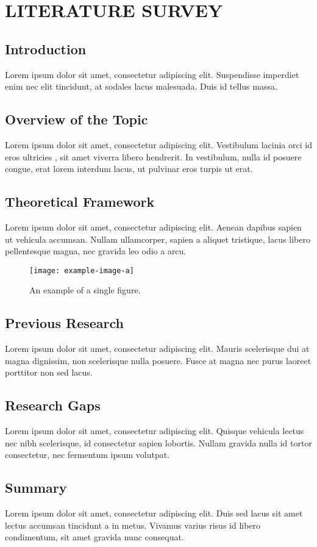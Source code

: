 \chapter{LITERATURE SURVEY}
\section{Introduction}
Lorem ipsum dolor sit amet, consectetur adipiscing elit. Suspendisse imperdiet enim nec elit tincidunt, at sodales lacus malesuada. Duis id tellus massa.

\section{Overview of the Topic}
Lorem ipsum dolor sit amet, consectetur adipiscing elit. Vestibulum lacinia orci id eros ultricies \cite{johnson2018deep}, sit amet viverra libero hendrerit. In vestibulum, nulla id posuere congue, erat lorem interdum lacus, ut pulvinar eros turpis ut erat.

\section{Theoretical Framework}
Lorem ipsum dolor sit amet, consectetur adipiscing elit. Aenean dapibus sapien ut vehicula accumsan. Nullam ullamcorper, sapien a aliquet tristique, lacus libero pellentesque magna, nec gravida leo odio a arcu.
\begin{figure}[ht]
    \centering
    \texttt{[image: example-image-a]}
    \caption{An example of a single figure.}
    \label{fig:single}
\end{figure}
\section{Previous Research}
Lorem ipsum dolor sit amet, consectetur adipiscing elit. Mauris scelerisque dui at magna dignissim, \cite{lee2019advances}non scelerisque nulla posuere. Fusce at magna nec purus laoreet porttitor non sed lacus.

\section{Research Gaps}
Lorem ipsum dolor sit amet, consectetur adipiscing elit. Quisque vehicula lectus nec nibh scelerisque, id consectetur sapien lobortis. Nullam gravida nulla id tortor consectetur, nec fermentum ipsum volutpat.

\section{Summary}
Lorem ipsum dolor sit amet, consectetur adipiscing elit. Duis sed lacus sit amet lectus accumsan tincidunt a in metus. Vivamus varius risus id libero condimentum, sit amet gravida nunc consequat.